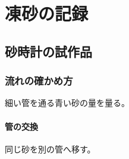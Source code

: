 \documentclass[lualatex,report,oneside]{jlreq}
\begin{document}
\part{凍砂の記録}
\chapter{砂時計の試作品}
\section{流れの確かめ方}
細い管を通る青い砂の量を量る。
\subsection{管の交換}
同じ砂を別の管へ移す。
\end{document}
